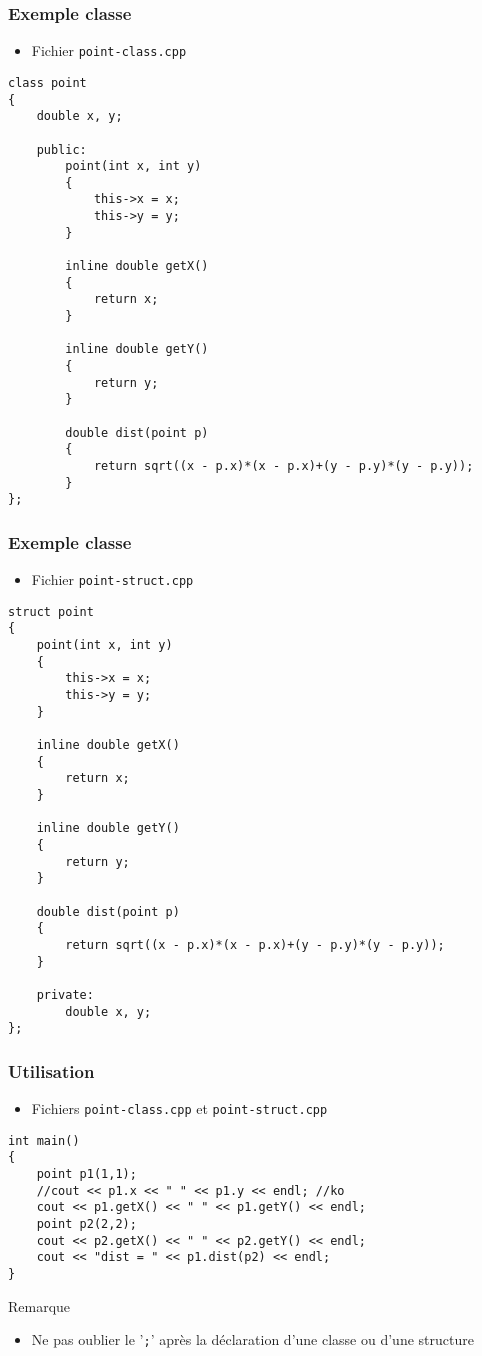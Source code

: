 \begin{frame}[containsverbatim]
\frametitle{Exemple classe}
\begin{itemize}
\item Fichier \texttt{point-class.cpp}
\end{itemize}
\begin{lstlisting}
class point
{
	double x, y;

	public:
		point(int x, int y)
		{
			this->x = x;
			this->y = y;
		}

		inline double getX()
		{
			return x;
		}

		inline double getY()
		{
			return y;
		}		

		double dist(point p)
		{
			return sqrt((x - p.x)*(x - p.x)+(y - p.y)*(y - p.y));
		} 	
};
\end{lstlisting}
\end{frame}

\begin{frame}[containsverbatim]
\frametitle{Exemple classe}
\begin{itemize}
\item Fichier \texttt{point-struct.cpp}
\end{itemize}
\begin{lstlisting}
struct point
{			
	point(int x, int y)
	{
		this->x = x;
		this->y = y;
	}

	inline double getX()
	{
		return x;
	}

	inline double getY()
	{
		return y;
	}		

	double dist(point p)
	{
		return sqrt((x - p.x)*(x - p.x)+(y - p.y)*(y - p.y));
	} 	

	private:
		double x, y;
};
\end{lstlisting}
\end{frame}

\begin{frame}[containsverbatim]
\frametitle{Utilisation}
\begin{itemize}
\item Fichiers \texttt{point-class.cpp} et \texttt{point-struct.cpp}
\end{itemize}
\begin{lstlisting}
int main()
{
	point p1(1,1);
	//cout << p1.x << " " << p1.y << endl; //ko
	cout << p1.getX() << " " << p1.getY() << endl;	
	point p2(2,2);
	cout << p2.getX() << " " << p2.getY() << endl;
	cout << "dist = " << p1.dist(p2) << endl;
}
\end{lstlisting}
\begin{alertblock}{Remarque}
	\begin{itemize}
	\item Ne pas oublier le '\texttt{;}' après la déclaration d'une classe ou d'une structure
	\end{itemize}
\end{alertblock}
\end{frame}

